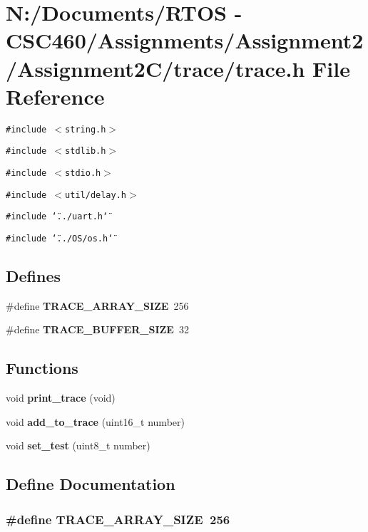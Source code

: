 \section{N:/Documents/RTOS - CSC460/Assignments/Assignment2/Assignment2C/trace/trace.h File Reference}
\label{trace_8h}
{\tt \#include $<$string.h$>$}\par
{\tt \#include $<$stdlib.h$>$}\par
{\tt \#include $<$stdio.h$>$}\par
{\tt \#include $<$util/delay.h$>$}\par
{\tt \#include \char`\"{}../uart.h\char`\"{}}\par
{\tt \#include \char`\"{}../OS/os.h\char`\"{}}\par
\subsection*{Defines}
\begin{CompactItemize}
\item 
\#define {\bf TRACE\_\-ARRAY\_\-SIZE}~256
\item 
\#define {\bf TRACE\_\-BUFFER\_\-SIZE}~32
\end{CompactItemize}
\subsection*{Functions}
\begin{CompactItemize}
\item 
void {\bf print\_\-trace} (void)
\item 
void {\bf add\_\-to\_\-trace} (uint16\_\-t number)
\item 
void {\bf set\_\-test} (uint8\_\-t number)
\end{CompactItemize}


\subsection{Define Documentation}
\subsubsection{\setlength{\rightskip}{0pt plus 5cm}\#define TRACE\_\-ARRAY\_\-SIZE~256}\label{trace_8h_6be0daabb7b1bd5e305f99640bc4c57d}


